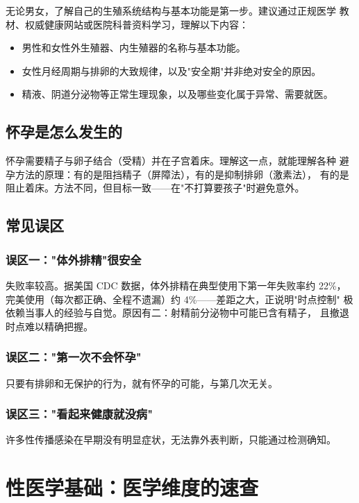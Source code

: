 \documentclass[12pt,UTF8,openany]{ctexbook}
\begin{document}
无论男女，了解自己的生殖系统结构与基本功能是第一步。建议通过正规医学
教材、权威健康网站或医院科普资料学习，理解以下内容：

\begin{itemize}
  \item 男性和女性外生殖器、内生殖器的名称与基本功能。
  \item 女性月经周期与排卵的大致规律，以及"安全期"并非绝对安全的原因。
  \item 精液、阴道分泌物等正常生理现象，以及哪些变化属于异常、需要就医。
\end{itemize}

\section{怀孕是怎么发生的}

怀孕需要精子与卵子结合（受精）并在子宫着床。理解这一点，就能理解各种
避孕方法的原理：有的是阻挡精子（屏障法），有的是抑制排卵（激素法），
有的是阻止着床。方法不同，但目标一致——在"不打算要孩子"时避免意外。

\section{常见误区}

\subsection*{误区一："体外排精"很安全}
失败率较高。据美国 CDC 数据，体外排精在典型使用下第一年失败率约 22\%，
完美使用（每次都正确、全程不遗漏）约 4\%——差距之大，正说明"时点控制"
极依赖当事人的经验与自觉。原因有二：射精前分泌物中可能已含有精子，
且撤退时点难以精确把握。

\subsection*{误区二："第一次不会怀孕"}
只要有排卵和无保护的行为，就有怀孕的可能，与第几次无关。

\subsection*{误区三："看起来健康就没病"}
许多性传播感染在早期没有明显症状，无法靠外表判断，只能通过检测确知。

\chapter{性医学基础：医学维度的速查}
\label{chap:medbase}
\end{document}

